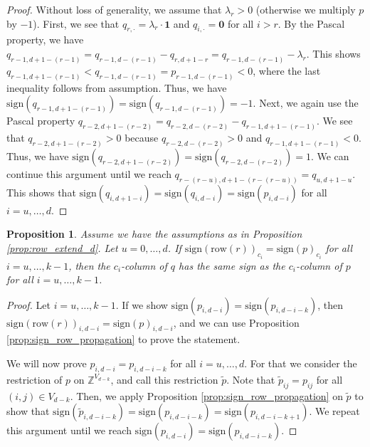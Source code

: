 \documentclass[11pt]{article}
\newtheorem{proposition}[theorem]{Proposition}
\begin{document}
\begin{proof}
  Without loss of generality, we assume that \( \lambda_r > 0 \) (otherwise we multiply \( p \) by \( -1 \)).
  First, we see that \( q_{r,\cdot} = \lambda_r \cdot \mathbf{1} \) and \( q_{i,\cdot} =  \mathbf{0} \) for all \( i > r \). By the Pascal property, we have \( q_{r-1,d+1-(r-1)} = q_{r-1,d-(r-1)} - q_{r,d+1-r} = q_{r-1,d-(r-1)} - \lambda_r \). This shows \( q_{r-1,d+1-(r-1)} < q_{r-1,d-(r-1)} = p_{r-1,d-(r-1)} < 0 \), where the last inequality follows from assumption. Thus, we have \( \mathrm{sign}(q_{r-1,d+1-(r-1)}) = \mathrm{sign}(q_{r-1,d-(r-1)}) = \mathbf -1\). Next, we again use the Pascal property \( q_{r-2,d+1-(r-2)} = q_{r-2,d-(r-2)} - q_{r-1,d+1-(r-1)} \). We see that \( q_{r-2,d+1-(r-2)} > 0 \) because \( q_{r-2,d-(r-2)} > 0 \) and \( q_{r-1,d+1-(r-1)} < 0 \). Thus, we have \( \mathrm{sign}(q_{r-2,d+1-(r-2)}) = \mathrm{sign}(q_{r-2,d-(r-2)}) = 1 \). We can continue this argument until we reach \( q_{r-(r-u),d+1-(r-(r-u))} = q_{u,d+1-u} \). This shows that \( \mathrm{sign}(q_{i,d+1-i}) = \mathrm{sign}(q_{i,d-i}) = \mathrm{sign}(p_{i,d-i}) \) for all \( i = u, \dots, d\).
\end{proof}

\begin{proposition}\label{prop:same_sign_propagation_easy}
  Assume we have the assumptions as in Proposition \ref{prop:row_extend_d}. Let \( u = 0, \dots, d \). If $\mathrm{sign}(\mathrm{row}(r))_{c_i} = \mathrm{sign}(p)_{c_i}$ for all \( i = u, \dots, k-1\), then the \( c_i \)-column of \( q  \) has the same sign as the \( c_i \)-column of \( p \) for all \( i = u, \dots, k-1\).
\end{proposition}

\begin{proof}
  Let \( i=u, \dots, k-1 \).
  If we show \( \mathrm{sign}(p_{i,d-i}) = \mathrm{sign}(p_{i,d-i-k}) \), then $\mathrm{sign}(\mathrm{row}(r))_{i,d-i} = \mathrm{sign}(p)_{i,d-i}$, and we can use Proposition \ref{prop:sign_row_propagation} to prove the statement.

  We will now prove \( p_{i,d-i} = p_{i,d-i-k} \) for all \( i = u, \dots, d\). For that we consider the restriction of \( p \) on \( \mathbb{Z}^{V_{d - k}} \), and call this restriction \( \tilde p \). Note that \( \tilde p_{ij} = p_{ij} \) for all \( (i,j) \in V_{d - k} \). Then, we apply Proposition \ref{prop:sign_row_propagation} on \( \tilde p \) to show that \( \mathrm{sign}(\tilde p_{i,d-i-k}) = \mathrm{sign}(p_{i,d-i-k}) = \mathrm{sign}(p_{i,d-i-k+1}) \). We repeat this argument until we reach \( \mathrm{sign}(p_{i,d-i}) = \mathrm{sign}(p_{i,d-i-k}) \).
\end{proof}
\end{document}
